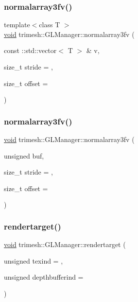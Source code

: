 \subsubsection{\texorpdfstring{normalarray3fv()}{normalarray3fv()}\hspace{0.1cm}{\footnotesize\ttfamily [2/3]}}
{\footnotesize\ttfamily template$<$class T $>$ \\
\hyperlink{namespacetrimesh_a784ddfd979e1c579bda795a8edfc3f43}{void} trimesh\+::\+G\+L\+Manager\+::normalarray3fv (\begin{DoxyParamCaption}\item[{const \+::std\+::vector$<$ T $>$ \&}]{v,  }\item[{size\+\_\+t}]{stride = {},  }\item[{size\+\_\+t}]{offset = {} }\end{DoxyParamCaption})\hspace{0.3cm}{\ttfamily [inline]}}

\mbox{\label{classtrimesh_1_1GLManager_a35d97651f164dbd3284ea2cdbffda626}} 
\subsubsection{\texorpdfstring{normalarray3fv()}{normalarray3fv()}\hspace{0.1cm}{\footnotesize\ttfamily [3/3]}}
{\footnotesize\ttfamily \hyperlink{namespacetrimesh_a784ddfd979e1c579bda795a8edfc3f43}{void} trimesh\+::\+G\+L\+Manager\+::normalarray3fv (\begin{DoxyParamCaption}\item[{unsigned}]{buf,  }\item[{size\+\_\+t}]{stride = {},  }\item[{size\+\_\+t}]{offset = {} }\end{DoxyParamCaption})}

\mbox{\label{classtrimesh_1_1GLManager_a98f73dc0002aa8a960b2f54489c0a40a}} 
\subsubsection{\texorpdfstring{rendertarget()}{rendertarget()}}
{\footnotesize\ttfamily \hyperlink{namespacetrimesh_a784ddfd979e1c579bda795a8edfc3f43}{void} trimesh\+::\+G\+L\+Manager\+::rendertarget (\begin{DoxyParamCaption}\item[{unsigned}]{texind = {},  }\item[{unsigned}]{depthbufferind = {} }\end{DoxyParamCaption})}



